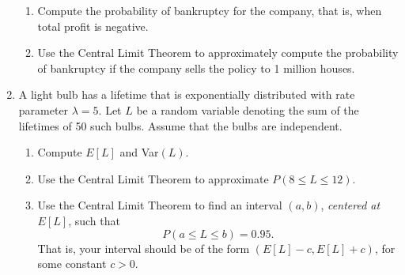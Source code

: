 \documentclass{article}    %
\begin{document}
\begin{enumerate}[leftmargin=0.55cm]
\begin{enumerate}
			
			\item Compute the probability of bankruptcy for the company, that is,
			when total profit is negative.
			
			
			\item Use the Central Limit Theorem to approximately compute the probability of bankruptcy if the company sells the policy to 1 million houses.
			
		\end{enumerate}
		
		
		\item A light bulb has a lifetime that is exponentially distributed with rate parameter $\lambda = 5$. Let $L$ be a random variable denoting the sum of the lifetimes of 50 such bulbs. Assume that the bulbs are independent. 
		\begin{enumerate}
			\item Compute $E[L]$ and Var$(L)$.
			
			\item Use the Central Limit Theorem to approximate $P(8 \leq L \leq 12)$.
			
			\item Use the Central Limit Theorem to find an interval $(a, b)$, \emph{centered at $E[L]$}, such that
			$$
			P(a \leq L \leq b) = 0.95.
			$$
			That is, your interval should be of the form $(E[L] - c, E[L] + c)$, for some constant $c > 0$. 
		\end{enumerate}
		
		
	\end{enumerate}
\end{document}
